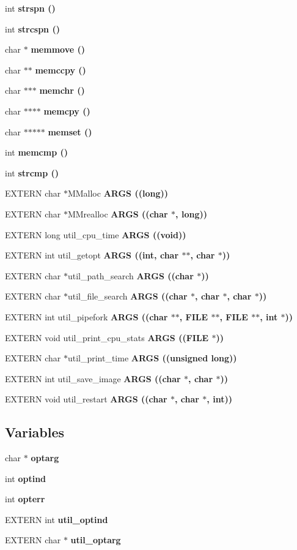 \begin{CompactItemize}
int \bf{strspn} ()
\item 
int \bf{strcspn} ()
\item 
char $\ast$ \bf{memmove} ()
\item 
char $\ast$$\ast$ \bf{memccpy} ()
\item 
char $\ast$$\ast$$\ast$ \bf{memchr} ()
\item 
char $\ast$$\ast$$\ast$$\ast$ \bf{memcpy} ()
\item 
char $\ast$$\ast$$\ast$$\ast$$\ast$ \bf{memset} ()
\item 
int \bf{memcmp} ()
\item 
int \bf{strcmp} ()
\item 
EXTERN char $\ast$MMalloc \bf{ARGS} ((long))
\item 
EXTERN char $\ast$MMrealloc \bf{ARGS} ((char $\ast$, long))
\item 
EXTERN long util\_\-cpu\_\-time \bf{ARGS} ((void))
\item 
EXTERN int util\_\-getopt \bf{ARGS} ((int, char $\ast$$\ast$, char $\ast$))
\item 
EXTERN char $\ast$util\_\-path\_\-search \bf{ARGS} ((char $\ast$))
\item 
EXTERN char $\ast$util\_\-file\_\-search \bf{ARGS} ((char $\ast$, char $\ast$, char $\ast$))
\item 
EXTERN int util\_\-pipefork \bf{ARGS} ((char $\ast$$\ast$, FILE $\ast$$\ast$, FILE $\ast$$\ast$, int $\ast$))
\item 
EXTERN void util\_\-print\_\-cpu\_\-stats \bf{ARGS} ((FILE $\ast$))
\item 
EXTERN char $\ast$util\_\-print\_\-time \bf{ARGS} ((unsigned long))
\item 
EXTERN int util\_\-save\_\-image \bf{ARGS} ((char $\ast$, char $\ast$))
\item 
EXTERN void util\_\-restart \bf{ARGS} ((char $\ast$, char $\ast$, int))
\end{CompactItemize}
\subsection*{Variables}
\begin{CompactItemize}
\item 
char $\ast$ \bf{optarg}
\item 
int \bf{optind}
\item 
int \bf{opterr}
\item 
EXTERN int \bf{util\_\-optind}
\item 
EXTERN char $\ast$ \bf{util\_\-optarg}
\end{CompactItemize}


